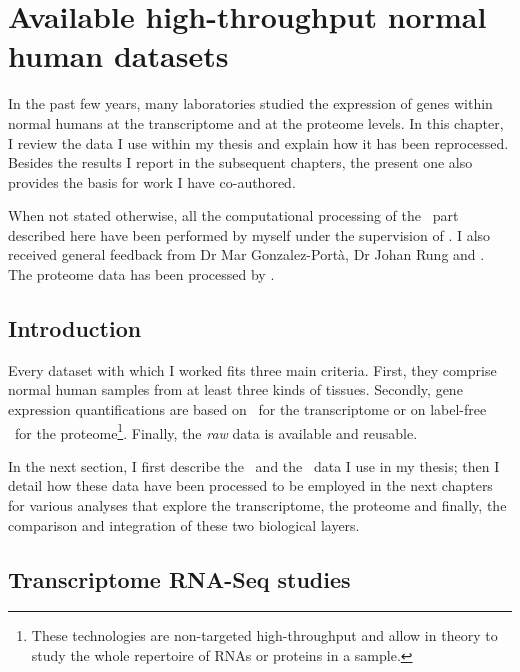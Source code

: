 \chapter{Available high-throughput normal human datasets}
\label{ch:datasets}

\begin{comment}
\setlength{\epigraphwidth}{0.8\textwidth}%
\setlength{\epigraphrule}{0pt}%
\epigraphhead[70]{%
\epigraph{Data! Data! Data! I can’t make bricks without clay!}{Sherlock Homes\\
(Sir Arthur Conan Doyle)}}
\end{comment}


In the past few years, many laboratories studied the expression
of genes within normal humans at the transcriptome and at
the proteome levels. In this chapter, I review the data I use within my thesis
and explain how it has been reprocessed.
Besides the results I report in the subsequent chapters,
the present one also provides the basis for work
I have co-authored.

When not stated otherwise, all the computational processing of the \Rnaseq\ part
described here have been performed by myself under the supervision of
\alvis. I also received general feedback from Dr Mar Gonzalez-Portà,
Dr Johan Rung and \nuno. The proteome data has been processed by \james.


\section{Introduction}

Every dataset with which I worked fits three main criteria.
First, they comprise normal human samples from at least three kinds of tissues.
Secondly, gene expression
quantifications are based on \Rnaseq\ for the transcriptome or on label-free \ms\
for the proteome\footnote{These
technologies are non-targeted high-throughput and
allow in theory to study the whole
repertoire of \glspl{RNA} or proteins in a sample.}.
Finally, the \emph{raw} data is available and reusable.

In the next section, I first describe the \Rnaseq\ and the \ms\ data I use
in my thesis; then I detail how these data have been processed to be
employed in the next chapters for various analyses that explore the transcriptome,
the proteome and finally, the comparison and integration of these two
biological layers.


\section{Transcriptome RNA-Seq studies}
\label{sec:rnaseq-data}

